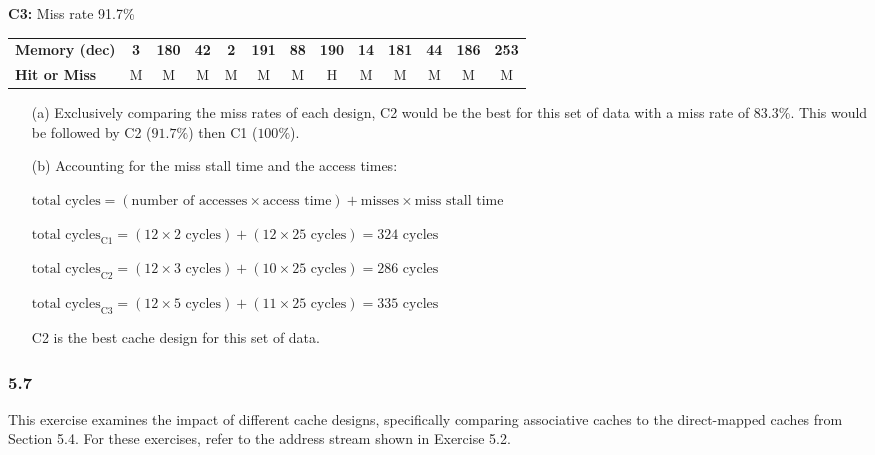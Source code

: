 \documentclass[fleqn]{article}
\begin{document}
\textbf{C3:} Miss rate 91.7\%
\vspace{-0.1in}
\begin{table}[H]
    \setlength{\tabcolsep}{6pt}
    \fontsize{9pt}{12pt}\selectfont
    \begin{tabular}{l|c|c|c|c|c|c|c|c|c|c|c|c}
    \textbf{Memory (dec)} & \textbf{3} & \textbf{180} & \textbf{42} & \textbf{2} & \textbf{191} & \textbf{88} & \textbf{190} & \textbf{14} & \textbf{181} & \textbf{44} & \textbf{186} & \textbf{253} \\ 
    \textbf{Hit or Miss} & M & M & M & M & M & M & H & M & M & M & M & M \\
    \end{tabular}
    \end{table}
\begin{itemize}
    \item[(a)] Exclusively comparing the miss rates of each design, C2 would be the best for this set of data with a miss rate of $83.3\%$. This would be followed by C2 ($91.7\%$) then C1 ($100\%$).
    \item[(b)] Accounting for the miss stall time and the access times:
    \begin{addmargin}[0.5cm]{0cm}
    $\text{total cycles} = (\text{number of accesses} \times \text{access time}) + \text{misses} \times \text{miss stall time}$

    $\text{total cycles}_{\text{C1}} = (12 \times 2 \text{ cycles}) + (12 \times 25 \text{ cycles}) = 324 \text{ cycles}$

    $\text{total cycles}_{\text{C2}} = (12 \times 3 \text{ cycles}) + (10 \times 25 \text{ cycles}) = 286 \text{ cycles}$

    $\text{total cycles}_{\text{C3}} = (12 \times 5 \text{ cycles}) + (11 \times 25 \text{ cycles}) = 335 \text{ cycles}$
    \end{addmargin}
    C2 is the best cache design for this set of data.
\end{itemize}

\subsubsection*{5.7} This exercise examines the impact of different cache designs, specifically comparing associative caches to the direct-mapped caches from Section 5.4. For these exercises, refer to the address stream shown in Exercise 5.2.
\end{document}
